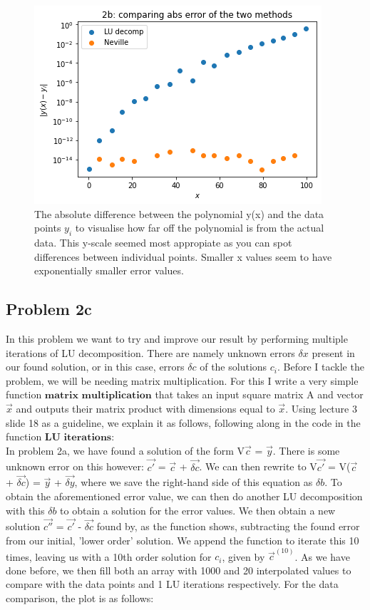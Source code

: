 \begin{figure}[h!]
  \centering
  \includegraphics[width=0.6\linewidth]{problem2b2.png}
  \caption{The absolute difference between the polynomial y(x) and the data points $y_i$ to visualise how far off the polynomial is from the actual data. This y-scale seemed most appropiate as you can spot differences between individual points. Smaller x values seem to have exponentially smaller error values.}
  \label{fig:fig4}
\end{figure}

\subsection{Problem 2c}

In this problem we want to try and improve our result by performing multiple iterations of LU decomposition. There are namely unknown errors $\delta x$ present in our found solution, or in this case, errors $\delta c$ of the solutions $c_i$. Before I tackle the problem, we will be needing matrix multiplication. For this I write a very simple function $\textbf{matrix multiplication}$ that takes an input square matrix A and vector $\vec{x}$ and outputs their matrix product with dimensions equal to $\vec{x}$. Using lecture 3 slide 18 as a guideline, we explain it as follows, following along in the code in the function $\textbf{LU iterations}$:\\
In problem 2a, we have found a solution of the form V$\vec{c}$ = $\vec{y}$. There is some unknown error on this however: $\vec{c'}$ = $\vec{c}$ + $\vec{\delta c}$. We can then rewrite to V$\vec{c'}$ = V($\vec{c}$ + $\vec{\delta c}$) = $\vec{y}$ + $\vec{\delta y}$, where we save the right-hand side of this equation as $\delta b$. To obtain the aforementioned error value, we can then do another LU decomposition with this $\delta b$ to obtain a solution for the error values. We then obtain a new solution $\vec{c''}$ = $\vec{c'}$ - $\vec{\delta c}$ found by, as the function shows, subtracting the found error from our initial, 'lower order' solution. We append the function to iterate this 10 times, leaving us with a 10th order solution for $c_i$, given by $\vec{c}^{(10)}$. As we have done before, we then fill both an array with 1000 and 20 interpolated values to compare with the data points and 1 LU iterations respectively. For the data comparison, the plot is as follows:\\

